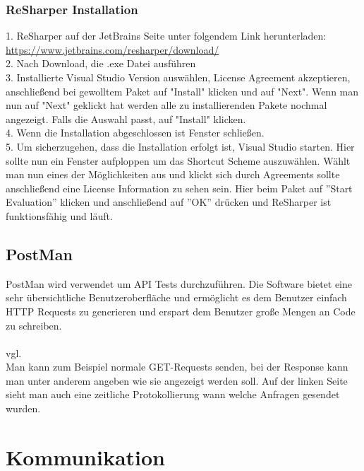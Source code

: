 \subsubsection{ReSharper Installation}
\label{sec:ReSharperInstallation}
1. ReSharper auf der JetBrains Seite unter folgendem Link herunterladen: \break \url {https://www.jetbrains.com/resharper/download/} \\
2. Nach Download, die .exe Datei ausführen \\
3. Installierte Visual Studio Version auswählen, License Agreement akzeptieren, anschließend bei gewolltem Paket auf "Install" klicken und auf "Next". 
Wenn man nun auf "Next" geklickt hat werden alle zu installierenden Pakete nochmal angezeigt. Falls die Auswahl passt, auf "Install" klicken. \\
4. Wenn die Installation abgeschlossen ist Fenster schließen. \\
5. Um sicherzugehen, dass die Installation erfolgt ist, Visual Studio starten. Hier sollte nun ein Fenster aufploppen um das Shortcut Scheme auszuwählen.
Wählt man nun eines der Möglichkeiten aus und klickt sich durch Agreements sollte anschließend eine License Information zu sehen sein. Hier beim Paket auf ''Start Evaluation'' klicken und anschließend auf ''OK'' drücken und ReSharper ist funktionsfähig und läuft.
\subsection {PostMan}
\label{sec:PostMan}
PostMan wird verwendet um API Tests durchzuführen. Die Software bietet eine sehr übersichtliche Benutzeroberfläche und ermöglicht es dem Benutzer einfach HTTP Requests zu generieren und erspart dem Benutzer große Mengen an Code zu schreiben. \\
\\vgl. \cite{TechnologiePostman} \\ \break
Man kann zum Beispiel normale GET-Requests senden, bei der Response kann man unter anderem angeben wie sie angezeigt werden soll. Auf der linken Seite sieht man auch eine zeitliche Protokollierung wann welche Anfragen gesendet wurden.
\section{Kommunikation}
\label{sec:Kommunikation}

